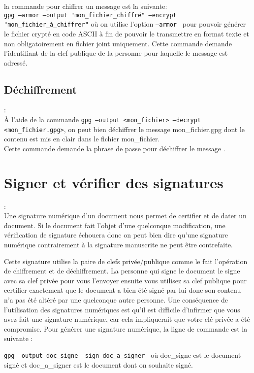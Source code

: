 la commande pour chiffrer un message est la suivante:\\
\texttt{gpg --armor --output "mon\_fichier\_chiffré" --encrypt "mon\_fichier\_à\_chiffrer"}
où on utilise l'option \texttt{--armor } pour pouvoir générer le fichier crypté en code ASCII à fin de pouvoir le transmettre en 
format texte et non obligatoirement en fichier joint uniquement.
Cette commande demande l'identifiant de la clef publique de la personne pour laquelle le message est adressé.


\subsection {Déchiffrement}:\\
À l'aide de la commande \texttt{gpg --output <mon\_fichier> --decrypt <mon\_fichier.gpg>}, on peut bien déchiffrer le message 
mon\_fichier.gpg dont le contenu est mis en clair dans le fichier  mon\_fichier.\\

Cette commande demande la phrase de passe pour déchiffrer le message .


\section {Signer et vérifier des signatures} :\\

Une signature numérique d'un document nous permet de certifier et de dater un document. Si le document fait l'objet d'une quelconque
modification, une vérification de signature échouera donc on peut bien dire qu'une signature numérique contrairement à la signature 
manuscrite ne peut être contrefaite.

Cette signature utilise la paire de clefs privée/publique comme le fait l'opération de chiffrement et de déchiffrement.
La personne qui signe le document le signe avec sa clef privée pour vous l'envoyer ensuite vous utilisez sa clef publique
pour certifier exactement que le document a bien été signé par lui donc son contenu n'a pas été altéré par une quelconque 
autre personne. Une conséquence de l'utilisation des signatures numériques est qu'il est difficile d'infirmer que vous avez fait
une signature numérique, car cela impliquerait que votre clé privée a été compromise.
Pour générer une signature numérique, la ligne de commande est la suivante :

\texttt{gpg --output doc\_signe --sign doc\_a\_signer } où doc\_signe est le document signé et doc\_a\_signer est le document 
dont on souhaite signé.\\
 
